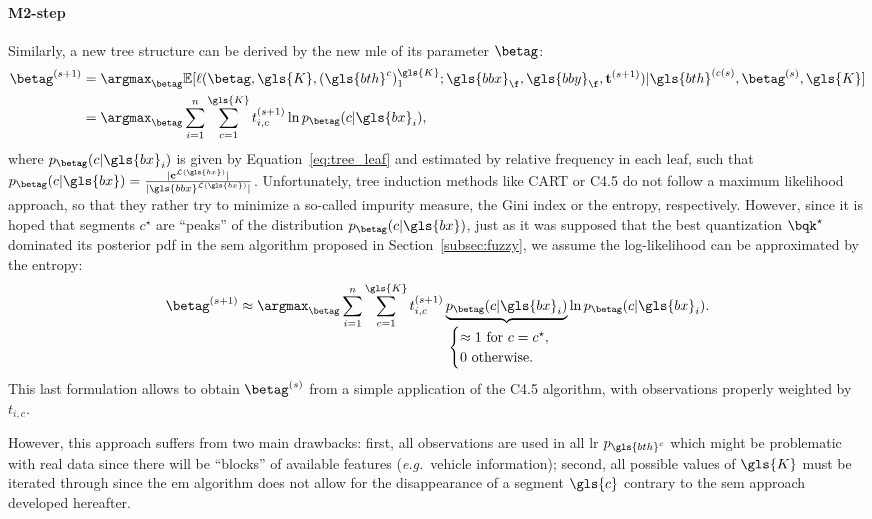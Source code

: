 \paragraph{M2-step}
Similarly, a new tree structure can be derived by the new \gls{mle} of its parameter $\betag$:
\begin{align*}
\betag^{(s+1)} & = \argmax_{\betag} \mathbb{E}[\ell(\betag, \gls{K}, (\gls{bth}^c)_1^{\gls{K}}; \gls{bbx}_{\f}, \gls{bby}_{\f}, \mathbf{t}^{(s+1)}) | \gls{bth}^{(c(s)}, \betag^{(s)}, \gls{K}] \\
 & = \argmax_{\betag} \sum_{i=1}^n \sum_{c=1}^{\gls{K}} t_{i,c}^{(s+1)} \ln p_{\betag}( c | \gls{bx}_i),
\end{align*}
where $p_{\betag}( c | \gls{bx}_i)$ is given by Equation~\eqref{eq:tree_leaf} and estimated by relative frequency in each leaf, such that $p_{\betag}(c | \gls{bx}) = \frac{|\mathbf{c}^{\mathcal{L}(\gls{bx})}|}{|\gls{bbx}^{\mathcal{L}(\gls{bx})}|}$. Unfortunately, tree induction methods like CART or C4.5 do not follow a maximum likelihood approach, so that they rather try to minimize a so-called impurity measure, the Gini index or the entropy, respectively. However, since it is hoped that segments $c^\star$ are ``peaks'' of the distribution $p_{\betag}( c | \gls{bx})$, just as it was supposed that the best quantization $\bqk^\star$ dominated its posterior \gls{pdf} in the \gls{sem} algorithm proposed in Section~\ref{subsec:fuzzy}, we assume the log-likelihood can be approximated by the entropy:
\[ \betag^{(s+1)} \approx \argmax_{\betag} \sum_{i=1}^n \sum_{c=1}^{\gls{K}} t_{i,c}^{(s+1)} \underbrace{p_{\betag}( c | \gls{bx}_i)}_{\begin{cases} \approx 1 \text{ for } c = c^\star, \\ 0 \text{ otherwise.} \end{cases}} \ln p_{\betag}( c | \gls{bx}_i). \]
This last formulation allows to obtain $\betag^{(s)}$ from a simple application of the C4.5 algorithm, with observations properly weighted by $t_{i,c}$.

However, this approach suffers from two main drawbacks: first, all observations are used in all \gls{lr} $p_{\gls{bth}^c}$ which might be problematic with real data since there will be ``blocks'' of available features (\textit{e.g.}\ vehicle information); second, all possible values of $\gls{K}$ must be iterated through since the \gls{em} algorithm does not allow for the disappearance of a segment $\gls{c}$ contrary to the \gls{sem} approach developed hereafter.

